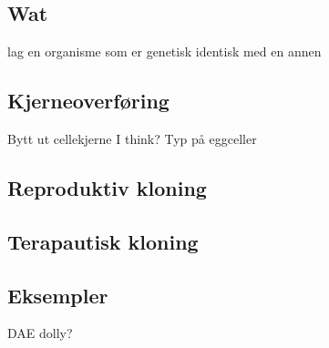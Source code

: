 \subsection{Wat}
    lag en organisme som er genetisk identisk med en annen

\subsection{Kjerneoverføring}
    Bytt ut cellekjerne I think? Typ på eggceller

\subsection{Reproduktiv kloning}

\subsection{Terapautisk kloning}

\subsection{Eksempler}
    DAE dolly?
